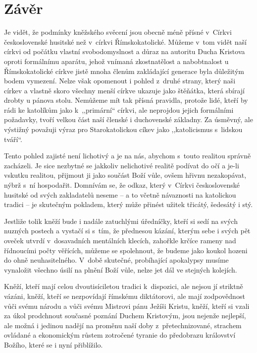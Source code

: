 \chapter{Závěr}

Je vidět, že podmínky kněžského svěcení jsou obecně méně přísné v~Církvi
československé husitské než v~církvi Římskokatolické. Můžeme v~tom vidět naší
církvi od počátku vlastní svobodomyslnost a důraz na autoritu Ducha Kristova
oproti formálnímu aparátu, jehož vnímaná zkostnatělost a nabobtnalost u
Římskokatolické církve jistě mnoha členům zakládající generace byla důležitým bodem
vymezení. Nelze však opomenout i pohled z~druhé strany, který naši církev a
vlastně skoro všechny menší církve ukazuje jako štěňátka, která sbírají drobty u
pánova stolu. Nemůžeme mít tak přísná pravidla, protože lidé, kteří by rádi ke
katolíkům jako k~,,primární`` církvi, ale neprojdou jejich formálními požadavky,
tvoří velkou část naší členské i duchovenské základny. Za úsměvný, ale výstižný
považuji výraz pro Starokatolickou cíkev jako ,,katolicismus s~lidskou tváří``.

Tento pohled zajisté není lichotivý a je na nás, abychom s~touto realitou
správně zacházeli. Je sice nezbytné se jakkoliv nelichotivé realitě podívat do
očí a je-li vskutku realitou, přijmout ji jako součást Boží vůle, ovšem hřivnu
nezakopávat, nýbrž s~ní hospodařit. Domnívám se, že odkaz, který v~Církvi
československé husitské od svých zakladatelů neseme -- a to včetně návaznosti na
katolickou tradici -- je skutečným pokladem, který může přinést užitek třicátý,
šedesátý i stý.

Jestliže tolik kněží bude i nadále zatuchlými úředníčky, kteří si sedí na svých
nuzných postech a vystačí si s~tím, že přednesou kázání, kterým sebe i svých pět
oveček utvrdí v~dosavadních mentálních klecích, zahořkle krčíce rameny nad
řídnoucími počty věřících, můžeme se spolehnout, že budeme jako koukol hozeni do
ohně neuhasitelného. V~době skutečné, probíhající apokalypsy musíme vynaložit
všechno úsilí na plnění Boží vůle, nelze jet dál ve stejných kolejích.

Kněží, kteří mají celou dvoutisíciletou tradici k~dispozici, ale nejsou jí
striktně vázáni, kněží, kteří se nezpovídají římskému diktátorovi, ale mají
zodpovědnost vůči svému národu a vůči svému Mistrovi pánu Ježíši Kristu, kněží,
kteří si vzali za úkol prodchnout současné poznání Duchem Kristovým, jsou
nejenže nejlepší, ale možná i jedinou nadějí na proměnu naší doby
z~přetechnizované, strachem ovládané a ekonomickým růstem zotročené tyranie do
předobrazu království Božího, které se i nyní přiblížilo.

